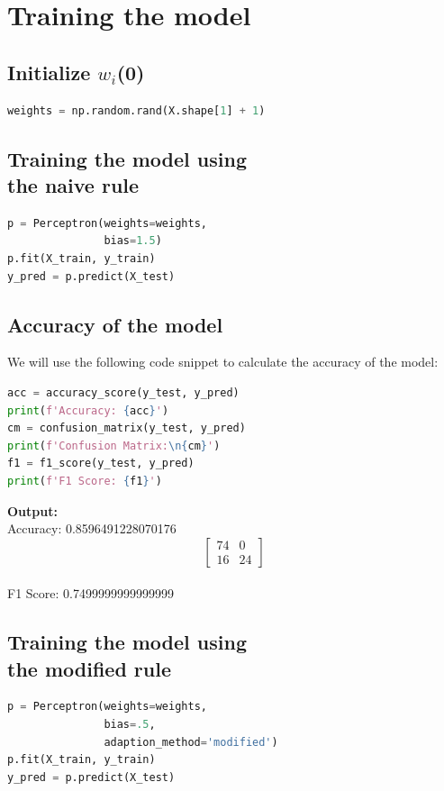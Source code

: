 \section{Training the model}
\subsection{Initialize $w_i$(0)}
\begin{lstlisting}[language=Python]
    weights = np.random.rand(X.shape[1] + 1)
\end{lstlisting}
\subsection{Training the model using \\the naive rule}
\begin{lstlisting}[language=Python]
p = Perceptron(weights=weights, 
               bias=1.5)
p.fit(X_train, y_train)
y_pred = p.predict(X_test)
\end{lstlisting}
\subsection{Accuracy of the model}
We will use the following code snippet to calculate the accuracy of the model:
\begin{lstlisting}[language=Python]
acc = accuracy_score(y_test, y_pred)
print(f'Accuracy: {acc}')
cm = confusion_matrix(y_test, y_pred)
print(f'Confusion Matrix:\n{cm}')
f1 = f1_score(y_test, y_pred)
print(f'F1 Score: {f1}')
\end{lstlisting}
\textbf{Output:}\\
Accuracy: 0.8596491228070176\\
$$
\begin{bmatrix}
74 & 0 \\
16 & 24
\end{bmatrix}
$$\\
F1 Score: 0.7499999999999999
\subsection{Training the model using \\the modified rule}
\begin{lstlisting}[language=Python]
p = Perceptron(weights=weights, 
               bias=.5, 
               adaption_method='modified')
p.fit(X_train, y_train)
y_pred = p.predict(X_test)
\end{lstlisting}
